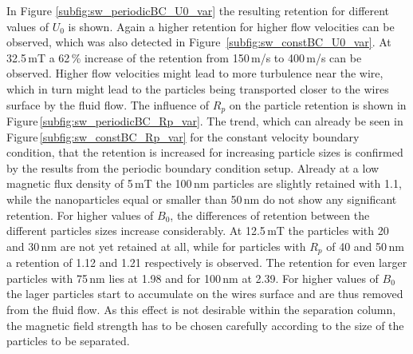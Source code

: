 In Figure \ref{subfig:sw_periodicBC_U0_var} the resulting retention for different values of  $U_{0}$ is shown. Again a higher retention for higher flow velocities can be observed, which was also detected in Figure \,\ref{subfig:sw_constBC_U0_var}. At 32.5\,mT a 62\,\% increase of the retention from 150\,\textmu m/s to 400\,\textmu m/s can be observed. Higher flow velocities might lead to more turbulence near the wire, which in turn might lead to the particles being transported closer to the wires surface by the fluid flow. The influence of $R_{p}$ on the particle retention is shown in Figure\,\ref{subfig:sw_periodicBC_Rp_var}. The trend, which can already be seen in Figure\,\ref{subfig:sw_constBC_Rp_var} for the constant velocity boundary condition, that the retention is increased for increasing particle sizes is confirmed by the results from the periodic boundary condition setup. Already at a low magnetic flux density of 5\,mT the 100\,nm particles are slightly retained with 1.1, while the nanoparticles equal or smaller than 50\,nm do not show any significant retention. For higher values of $B_{0}$, the differences of retention between the different particles sizes increase considerably. At 12.5\,mT the particles with 20 and 30\,nm are not yet retained at all, while for particles with $R_{p}$ of 40 and 50\,nm a retention of 1.12 and 1.21 respectively is observed. The retention for even larger particles with 75\,nm lies at 1.98 and for 100\,nm at 2.39. For higher values of $B_{0}$ the lager particles start to accumulate on the wires surface and are thus removed from the fluid flow. As this effect is not desirable within the separation column, the magnetic field strength has to be chosen carefully according to the size of the particles to be separated. \newline \\

